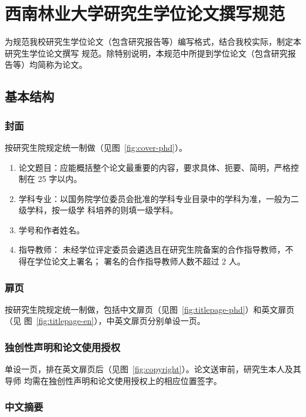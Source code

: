 \chapter{西南林业大学研究生学位论文撰写规范}
\label{cha:spec}

为规范我校研究生学位论文（包含研究报告等）编写格式，结合我校实际，制定本研究生学位论文撰写
规范。除特别说明，本规范中所提到学位论文（包含研究报告等）均简称为论文。

\section{基本结构}
\label{sec:basic}

\subsection{封面}%
\label{sec:cover}

按研究生院规定统一制做（见图~\ref{fig:cover-phd}）。

\begin{enumerate}
\item 论文题目：应能概括整个论文最重要的内容，要求具体、扼要、简明，严格控制在 25 字以内。
\item 学科专业：以国务院学位委员会批准的学科专业目录中的学科为准，一般为二级学科，按一级学
  科培养的则填一级学科。
\item 学号和作者姓名。
\item 指导教师： 未经学位评定委员会遴选且在研究生院备案的合作指导教师，不得在学位论文上署名；
  署名的合作指导教师人数不超过 2 人。
\end{enumerate}

\subsection{扉页}%
\label{sec:title}

按研究生院规定统一制做，包括中文扉页（见图~\ref{fig:titlepage-phd}）和英文扉页（见
图~\ref{fig:titlepage-en}），中英文扉页分别单设一页。

\subsection{独创性声明和论文使用授权}
\label{sec:copyright}

单设一页，排在英文扉页后（见图~\ref{fig:copyright}）。论文送审前，研究生本人及其导师
均需在独创性声明和论文使用授权上的相应位置签字。

\subsection{中文摘要}
\label{sec:abstract-cn}

